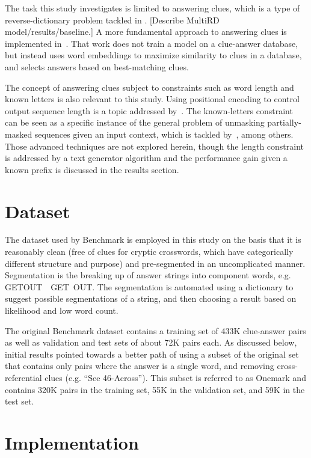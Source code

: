 \documentclass[letterpaper]{article} %
\begin{document}
\begin{NoHyper}
The task this study investigates is limited to answering clues, which is a type of reverse-dictionary problem tackled in \citealp{zhang2019multichannel}. [Describe MultiRD model/results/baseline.] A more fundamental approach to answering clues is implemented in~\citealp{baselinesolver}.
That work does not train a model on a clue-answer database, but instead uses word embeddings to maximize similarity to clues in a database, and selects answers based on best-matching clues.

The concept of answering clues subject to constraints such as word length and known letters is also relevant to this study. Using positional encoding to control output sequence length is a topic addressed by~\citealp{takase2019positional}. The known-letters constraint can be seen as a specific instance of the general problem of unmasking partially-masked sequences given an input context, which is tackled by~\citealp{raffel2023exploring}, among others. Those advanced techniques are not explored herein, though the length constraint is addressed by a text generator algorithm and the performance gain given a known prefix is discussed in the results section.


\section{Dataset}
\label{sec:dataset}

The dataset used by Benchmark is employed in this study on the basis that it is reasonably clean (free of clues for cryptic crosswords, which have categorically different structure and purpose) and pre-segmented in an uncomplicated manner. Segmentation is the breaking up of answer strings into component words, e.g. GETOUT~\textrightarrow~GET~OUT. The segmentation is automated using a dictionary to suggest possible segmentations of a string, and then choosing a result based on likelihood and low word count.

The original Benchmark dataset contains a training set of 433K clue-answer pairs as well as validation and test sets of about 72K pairs each. As discussed below, initial results pointed towards a better path of using a subset of the original set that contains only pairs where the answer is a single word, and removing cross-referential clues (e.g. ``See 46-Across''). This subset is referred to as Onemark and contains 320K pairs in the training set, 55K in the  validation set, and 59K in the test set.

\section{Implementation}
\label{sec:impl}


\end{NoHyper}
\end{document}
